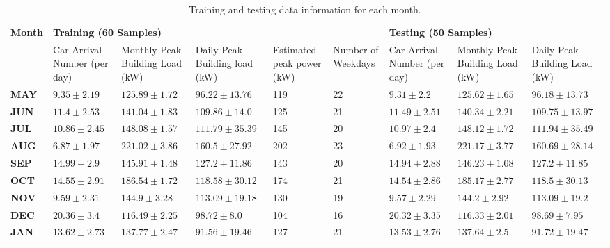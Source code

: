 \begin{table*}[htp]
\centering
\small 
\caption{Training and testing data information for each month.} 
\begin{tabular}{|p{1.0cm}|p{1.5cm}|p{1.7cm}|p{1.7cm}|p{1.0cm}|p{1.0cm}|p{1.5cm}|p{1.7cm}|p{1.7cm}|}
\hline
\multirow{2}{*}{\textbf{Month}} & \multicolumn{5}{p{3.75cm}|}{\textbf{Training (60 Samples)}} & \multicolumn{3}{p{3.75cm}|}{\textbf{Testing (50 Samples)}} \\ 
\cline{2-9} & {Car Arrival Number (per day)} & {Monthly Peak Building Load (kW)} & {Daily Peak Building load (kW)} & {Estimated peak power (kW)} & {Number of Weekdays} & {Car Arrival Number (per day)} & {Monthly Peak Building Load (kW)} & {Daily Peak Building Load (kW)} \\ \hline 
\textbf{MAY} & $9.35\pm2.19$ & $125.89\pm1.72$ & $96.22\pm13.76$ & 119 & 22 & $9.31\pm2.2$ & $125.62\pm1.65$ &$96.18\pm13.73$ \\ \hline

\textbf{JUN} & $11.4\pm2.53$ & $141.04\pm1.83$ & $109.86\pm14.0$ & 125 & 21 & $11.49\pm2.51$ & $140.34\pm2.21$ &$109.75\pm13.97$\\ \hline

\textbf{JUL} & $10.86\pm2.45$ & $148.08\pm1.57$ & $111.79\pm35.39$ & 145 & 20 & $10.97\pm2.4$ & $148.12\pm1.72$ &$111.94\pm35.49$\\ \hline

\textbf{AUG} & $6.87\pm1.97$ & $221.02\pm3.86$ & $160.5\pm27.92$ & 202 & 23 & $6.92\pm1.93$ & $221.17\pm3.77$ &$160.69\pm28.14$\\ \hline

\textbf{SEP} & $14.99\pm2.9$ & $145.91\pm1.48$ & $127.2\pm11.86$ & 143 & 20 & $14.94\pm2.88$ & $146.23\pm1.08$ &$127.2\pm11.85$\\ \hline

\textbf{OCT} & $14.55\pm2.91$ & $186.54\pm1.72$ & $118.58\pm30.12$& 174 & 21 & $14.54\pm2.86$ &$185.17\pm2.77$ &$118.5\pm30.13$ \\ \hline 

\textbf{NOV} & $9.59\pm2.31$ & $144.9\pm3.28$ & $113.09\pm19.18$ & 130 & 19 & $9.57\pm2.29$ & $144.2\pm2.92$&  $113.09\pm19.2$\\ \hline 

\textbf{DEC} & $20.36\pm3.4$ & $116.49\pm2.25$ & $98.72\pm8.0$ & 104 & 16 & $20.32\pm3.35$ & $116.33\pm2.01$ &$98.69\pm7.95$\\ \hline 

\textbf{JAN} & $13.62\pm2.73$ & $137.77\pm2.47$ & $91.56\pm19.46$ & 127 & 21 & $13.53\pm2.76$ & $137.64\pm2.5$ &$91.72\pm19.47$\\ \hline 
\end{tabular}
\label{tab:training_testing_data}
\end{table*}  